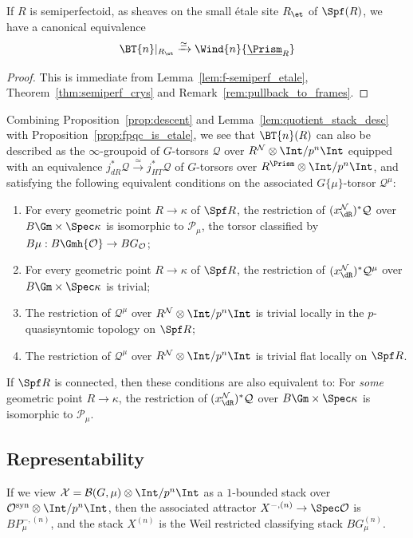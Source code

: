 \documentclass[10pt]{amsart}
\begin{document}
\begin{lemma}
\label{lem:quotient_stack_desc}
If $R$ is semiperfectoid, as sheaves on the small \'etale site $R_{\et}$ of $\Spf(R)$, we have a canonical equivalence
\[
\BT{n}\vert_{R_{\et}} \xrightarrow{\simeq}\Wind{n}{\underline{\Prism}_R}
\]
\end{lemma}
\begin{proof}
This is immediate from Lemma~\ref{lem:f-semiperf_etale}, Theorem~\ref{thm:semiperf_crys} and Remark~\ref{rem:pullback_to_frames}.
\end{proof}

\begin{remark}
\label{rem:pointwise_equiv_conditions}
Combining Proposition~\ref{prop:descent} and Lemma~\ref{lem:quotient_stack_desc} with Proposition~\ref{prop:fpqc_is_etale}, we see that $\BT{n}(R)$ can also be described as the $\infty$-groupoid of $G$-torsors $\mathcal{Q}$ over $R^{\mathcal{N}}\otimes\Int/p^n\Int$ equipped with an equivalence $j_{dR}^*\mathcal{Q}\xrightarrow{\simeq}j_{HT}^*\mathcal{Q}$ of $G$-torsors over $R^\Prism\otimes\Int/p^n\Int$, and satisfying the following equivalent conditions on the associated $G\{\mu\}$-torsor $\mathcal{Q}^\mu$:
\begin{enumerate}
   \item For every geometric point $R\to \kappa$ of $\Spf R$, the restriction of $(x^{\mathcal{N}}_{\dR})^*\mathcal{Q}$ over $B\Gm\times \Spec \kappa$ is isomorphic to $\mathcal{P}_\mu$, the torsor classified by $B\mu:B\Gmh{\mathcal{O}}\to BG_{\mathcal{O}}$;
   \item For every geometric point $R\to \kappa$ of $\Spf R$, the restriction of $(x^{\mathcal{N}}_{\dR})^*\mathcal{Q}^\mu$ over $B\Gm\times \Spec \kappa$ is trivial;
   \item  The restriction of $\mathcal{Q}^\mu$ over $R^{\mathcal{N}}\otimes\Int/p^n\Int$ is trivial locally in the $p$-quasisyntomic topology on $\Spf R$;
   \item  The restriction of $\mathcal{Q}^\mu$ over $R^{\mathcal{N}}\otimes\Int/p^n\Int$ is trivial flat locally on $\Spf R$.
\end{enumerate}
If $\Spf R$ is connected, then these conditions are also equivalent to: For \emph{some} geometric point $R\to \kappa$, the restriction of $(x^{\mathcal{N}}_{\dR})^* \mathcal{Q}$ over $B\Gm\times\Spec \kappa$ is isomorphic to $\mathcal{P}_\mu$.
\end{remark}


\subsection{Representability}
If we view $\mathcal{X} = \mathcal{B}(G,\mu)\otimes\Int/p^n\Int$ as a $1$-bounded stack over $\mathcal{O}^{\mathrm{syn}}\otimes\Int/p^n\Int$, then the associated attractor $X^{-,(n)}\to \Spec \mathcal{O}$ is $BP_\mu^{-,(n)}$, and the stack $X^{(n)}$ is the Weil restricted classifying stack $BG^{(n)}_\mu$. 
\end{document}
